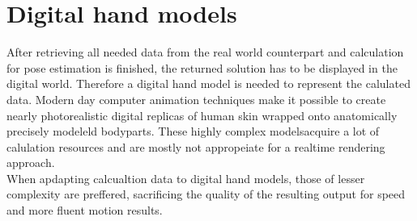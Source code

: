 \chapter{Digital hand models}
After retrieving all needed data from the real world counterpart and calculation for pose estimation is finished, the returned solution has to be displayed in the digital world. Therefore a digital hand model is needed to represent the calulated data. Modern day computer animation techniques make it possible to create nearly photorealistic digital replicas of human skin wrapped onto anatomically precisely modeleld bodyparts. These highly complex modelsacquire a lot of calulation resources and are mostly not appropeiate for a realtime rendering approach.\\
When apdapting calcualtion data to digital hand models, those of lesser complexity are preffered, sacrificing the quality of the resulting output for speed and more fluent motion results.
